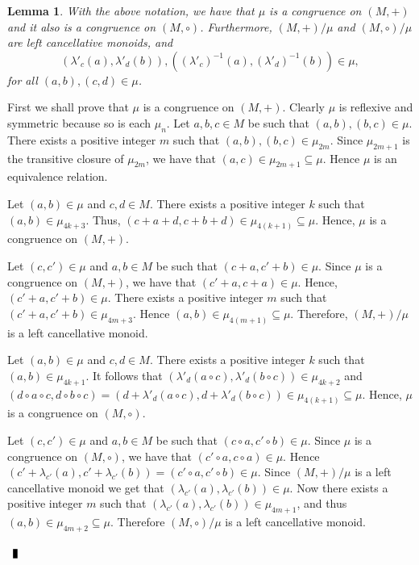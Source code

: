 \documentclass[10pt]{article}
\newtheorem{lemma}[theorem]{Lemma}
\newenvironment{proof}{\par\noindent{\bf Proof.}}{$\qed$\par\bigskip}
\newcommand{\qed}{\enspace\vrule  height6pt  width4pt  depth2pt}
\begin{document}
\begin{lemma}\label{congruence}
	With the above notation, we have that $\mu$ is a congruence on $(M,+)$ and  it also is a congruence on $(M,\circ)$. Furthermore, $(M,+)/\mu$ and $(M,\circ)/\mu$ are left cancellative monoids, and  
	$$( \lambda'_c(a),\lambda'_d(b)), ( (\lambda'_c)^{-1}(a),(\lambda'_d)^{-1}(b))\in\mu,$$
	for all $(a,b),(c,d)\in \mu$. 
\end{lemma}
\begin{proof}
	First we shall prove that $\mu$ is a congruence on $(M,+)$.
	Clearly $\mu$ is reflexive and symmetric because so is each
	$\mu_n$. Let $a,b,c\in M$ be  such that $(a,b),(b,c)\in \mu$. There
	exists a positive integer $m$ such that $(a,b),(b,c)\in
	\mu_{2m}$. Since $\mu_{2m+1}$ is the transitive closure of
	$\mu_{2m}$, we have that $(a,c)\in \mu_{2m+1}\subseteq \mu$.
	Hence $\mu$ is an equivalence relation. 
	
	Let $(a,b)\in \mu$ and $c,d\in M$. There exists a positive integer $k$ such that $(a,b)\in \mu_{4k+3}$. Thus, $(c+a+d,c+b+d)\in \mu_{4(k+1)}\subseteq \mu$. Hence, $\mu$ is a congruence on $(M,+)$. 
	
	Let $(c,c')\in\mu$ and $a,b\in M$ be such that $(c+a,c'+b)\in \mu$. Since $\mu$ is a congruence on $(M,+)$, we have that 
	$(c'+a,c+a)\in \mu$. Hence, $(c'+a,c'+b)\in \mu$. There exists a positive integer $m$ such that $(c'+a,c'+b)\in \mu_{4m+3}$. Hence $(a,b)\in \mu_{4(m+1)}\subseteq \mu$. Therefore, $(M,+)/\mu$ is a left cancellative monoid.
	
	Let $(a,b)\in \mu$ and $c,d\in M$. There exists a positive integer $k$ such that $(a,b)\in \mu_{4k+1}$. It follows that $(\lambda'_{d}(a\circ c),\lambda'_d(b\circ c))\in \mu_{4k+2}$ and $(d\circ a\circ c, d\circ b\circ c)=(d+\lambda'_{d}(a\circ c),d+\lambda'_d(b\circ c))\in \mu_{4(k+1)}\subseteq \mu$. Hence, $\mu$ is a congruence on $(M,\circ)$.
	
	Let $(c,c')\in\mu$ and $a,b\in M$ be such that $(c\circ a,c'\circ b)\in \mu$. Since $\mu$ is a congruence on $(M,\circ)$, we have that 
	$(c'\circ a,c\circ a)\in \mu$. Hence $(c'+\lambda_{c'}(a),c'+\lambda_{c'}(b))=(c'\circ a,c'\circ b)\in \mu$. Since $(M,+)/\mu$ is a left cancellative monoid we get that $(\lambda_{c'}(a),\lambda_{c'}(b))\in \mu$. Now there exists a positive integer $m$ such that
	$(\lambda_{c'}(a),\lambda_{c'}(b))\in \mu_{4m+1}$, and thus $(a,b)\in \mu_{4m+2}\subseteq \mu$. Therefore $(M,\circ)/\mu$ is a left cancellative monoid.
	

\end{proof}
\end{document}
